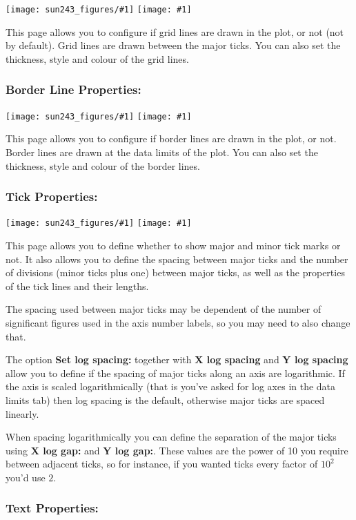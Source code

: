 \documentclass[twoside,11pt,nolof]{starlink}
\providecommand{\mainfigure}[1]
{\begin{center}
    \ifpdf
    \texttt{[image: sun243\_figures/\#1]}
    \else
    \texttt{[image: \#1]}
    \fi
 \end{center}
}
\newcommand{\labelitem}[1]{\textbf{#1}}
\begin{document}
\mainfigure{configurewindowgrid}

This page allows you to configure if grid lines are drawn in the plot,
or not (not by default). Grid lines are drawn between the major
ticks. You can also set the thickness, style and colour of the grid lines.

\newpage
\subsubsection*{Border Line Properties:}

\mainfigure{configurewindowborder}

This page allows you to configure if border lines are drawn in the plot,
or not. Border lines are drawn at the data limits of the plot. You can
also set the thickness, style and colour of the border lines.

\newpage
\subsubsection*{Tick Properties:}

\mainfigure{configurewindowticks}

This page allows you to define whether to show major and minor tick
marks or not. It also allows you to define the spacing between major
ticks and the number of divisions (minor ticks plus one) between major
ticks, as well as the properties of the tick lines and their lengths.

The spacing used between major ticks may be dependent of the number of
significant figures used in the axis number labels, so you may need to
also change that.

The option \labelitem{Set log spacing:} together with
\labelitem{X log spacing} and \labelitem{Y log spacing} allow you to define if
the spacing of major ticks along an axis are logarithmic. If the axis is
scaled logarithmically (that is you've asked for log axes in the data limits
tab) then log spacing is the default, otherwise major ticks are spaced
linearly.

When spacing logarithmically you can define the separation of the major ticks
using \labelitem{X log gap:} and \labelitem{Y log gap:}. These values are
the power of 10 you require between adjacent ticks, so for instance, if you
wanted ticks every factor of $10^2$ you'd use $2$.

\newpage
\subsubsection*{Text Properties:}
\end{document}
